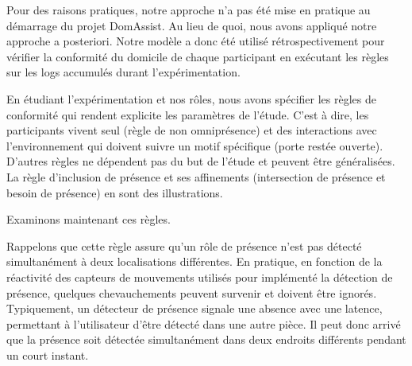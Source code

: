Pour des raisons pratiques, notre approche n'a pas été mise en pratique au démarrage du projet DomAssist. Au lieu de quoi, nous avons appliqué notre approche a posteriori. Notre modèle a donc été utilisé rétrospectivement pour vérifier la conformité du domicile de chaque participant en exécutant les règles sur les logs accumulés durant l'expérimentation.

En étudiant l'expérimentation et nos rôles, nous avons spécifier les règles de conformité qui rendent explicite les paramètres de l'étude. C'est à dire, les participants vivent seul (règle de non omniprésence) et des interactions avec l'environnement qui doivent suivre un motif spécifique (porte restée ouverte). D'autres règles ne dépendent pas du but de l'étude et peuvent être généralisées. La règle d'inclusion de présence et ses affinements (intersection de présence et besoin de présence) en sont des illustrations.

Examinons maintenant ces règles.

Rappelons que cette règle assure qu'un rôle de présence n'est pas détecté simultanément à deux localisations différentes. En pratique, en fonction de la réactivité des capteurs de mouvements utilisés pour implémenté la détection de présence, quelques chevauchements peuvent survenir et doivent être ignorés. Typiquement, un détecteur de présence signale une absence avec une latence, permettant à l'utilisateur d'être détecté dans une autre pièce. Il peut donc arrivé que la présence soit détectée simultanément dans deux endroits différents pendant un court instant.



